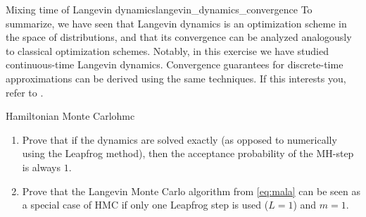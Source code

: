 \begin{nexercise}{Mixing time of Langevin dynamics}{langevin_dynamics_convergence}
  To summarize, we have seen that Langevin dynamics is an optimization scheme in the space of distributions, and that its convergence can be analyzed analogously to classical optimization schemes.
  Notably, in this exercise we have studied continuous-time Langevin dynamics.
  Convergence guarantees for discrete-time approximations can be derived using the same techniques.
  If this interests you, refer to .
\end{nexercise}

\begin{nexercise}{Hamiltonian Monte Carlo}{hmc}
  \begin{enumerate}
    \item Prove that if the dynamics are solved exactly (as opposed to numerically using the Leapfrog method), then the acceptance probability of the MH-step is always $1$.
    \item Prove that the Langevin Monte Carlo algorithm from \eqref{eq:mala} can be seen as a special case of HMC if only one Leapfrog step is used ($L = 1$) and $m = 1$.
  \end{enumerate}
\end{nexercise}
